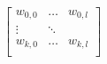 \documentclass[10pt]{article}
\begin{document}
\begin{align*}\begin{bmatrix}
w_{0,0} & \dots & w_{0,l}\\
\vdots & \ddots & \\
w_{k,0} & \dots & w_{k,l}\\
\end{bmatrix}
\end{align*}
\end{document}
